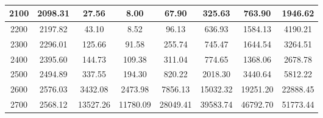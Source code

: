 \begin{table}[!h]
\begin{adjustwidth}{-2cm}{-2cm}
\begin{tabular}{|c|c|c|c|c|c|c|c|}
			2100 & 2098.31 & 27.56 & 8.00 & 67.90 & 325.63 & 763.90 & 1946.62 \\ \hline
			2200 & 2197.82 & 43.10 & 8.52 & 96.13 & 636.93 & 1584.13 & 4190.21 \\ \hline
			2300 & 2296.01 & 125.66 & 91.58 & 255.74 & 745.47 & 1644.54 & 3264.51 \\ \hline
			2400 & 2395.60 & 144.73 & 109.38 & 311.04 & 774.65 & 1368.06 & 2678.78 \\ \hline
			2500 & 2494.89 & 337.55 & 194.30 & 820.22 & 2018.30 & 3440.64 & 5812.22 \\ \hline
			2600 & 2576.03 & 3432.08 & 2473.98 & 7856.13 & 15032.32 & 19251.20 & 22888.45 \\ \hline
			2700 & 2568.12 & 13527.26 & 11780.09 & 28049.41 & 39583.74 & 46792.70 & 51773.44 \\ \hline
		\end{tabular}
		\centering
		\caption{}
		\label{result::}
	\end{adjustwidth}
\end{table}
